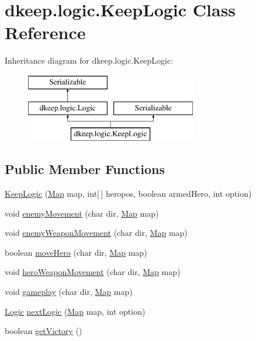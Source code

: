 \hypertarget{classdkeep_1_1logic_1_1_keep_logic}{}\section{dkeep.\+logic.\+Keep\+Logic Class Reference}
\label{classdkeep_1_1logic_1_1_keep_logic}
Inheritance diagram for dkeep.\+logic.\+Keep\+Logic\+:\begin{figure}[H]
\begin{center}
\leavevmode
\includegraphics[height=3.000000cm]{classdkeep_1_1logic_1_1_keep_logic}
\end{center}
\end{figure}
\subsection*{Public Member Functions}
\begin{DoxyCompactItemize}
\item 
\hyperlink{classdkeep_1_1logic_1_1_keep_logic_a9dc4f4d265b8964807c6d3f7e306e2c9}{Keep\+Logic} (\hyperlink{classdkeep_1_1logic_1_1_map}{Map} map, int\mbox{[}$\,$\mbox{]} heropos, boolean armed\+Hero, int option)
\item 
void \hyperlink{classdkeep_1_1logic_1_1_keep_logic_a591c644d50fb74047689ee7f23e4e9e0}{enemy\+Movement} (char dir, \hyperlink{classdkeep_1_1logic_1_1_map}{Map} map)
\item 
void \hyperlink{classdkeep_1_1logic_1_1_keep_logic_a02e0e445c71a2d460eea461ed8aadb67}{enemy\+Weapon\+Movement} (char dir, \hyperlink{classdkeep_1_1logic_1_1_map}{Map} map)
\item 
boolean \hyperlink{classdkeep_1_1logic_1_1_keep_logic_aee771ab14d616048b4257d7cecaad640}{move\+Hero} (char dir, \hyperlink{classdkeep_1_1logic_1_1_map}{Map} map)
\item 
void \hyperlink{classdkeep_1_1logic_1_1_keep_logic_a4f6646f5672e33e69d2d16e759223775}{hero\+Weapon\+Movement} (char dir, \hyperlink{classdkeep_1_1logic_1_1_map}{Map} map)
\item 
void \hyperlink{classdkeep_1_1logic_1_1_keep_logic_a3fd0f0c657498c6cbe5d853bbf35b421}{gameplay} (char dir, \hyperlink{classdkeep_1_1logic_1_1_map}{Map} map)
\item 
\hyperlink{classdkeep_1_1logic_1_1_logic}{Logic} \hyperlink{classdkeep_1_1logic_1_1_keep_logic_ac88c1dcda340a853c14ae4f9a9f89095}{next\+Logic} (\hyperlink{classdkeep_1_1logic_1_1_map}{Map} map, int option)
\item 
boolean \hyperlink{classdkeep_1_1logic_1_1_keep_logic_ac46609fcbfdc60046724ae28b369de4a}{get\+Victory} ()
\end{DoxyCompactItemize}
